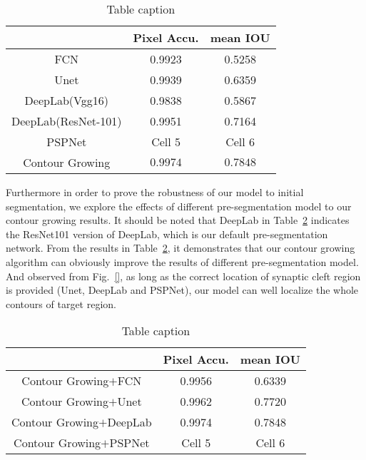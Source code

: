\begin{table}[t]
\begin{center}
\caption{Table caption} \label{tab:report1}
\begin{tabular}{|c|c|c|}
  \hline
   & Pixel Accu. & mean IOU
  \\
  \hline
  FCN & 0.9923 & 0.5258 \\
  Unet &  0.9939 & 0.6359 \\
  DeepLab(Vgg16) & 0.9838 & 0.5867 \\
  DeepLab(ResNet-101) & 0.9951 & 0.7164 \\
  PSPNet & Cell 5 & Cell 6 \\
  Contour Growing & $\mathbf{0.9974}$ & $\mathbf{0.7848}$ \\
  \hline
\end{tabular}
\end{center}
\end{table}

Furthermore in order to prove the robustness of our model to initial segmentation, we explore the effects of different pre-segmentation model to our contour growing results.
It should be noted that DeepLab in Table~\ref{tab:report2} indicates the ResNet101 version of DeepLab, which is our default pre-segmentation network.
From the results in Table~\ref{tab:report2}, it demonstrates that our contour growing algorithm can obviously improve the results of different pre-segmentation model.
And observed from Fig.~\ref{}, as long as the correct location of synaptic cleft region is provided (Unet, DeepLab and PSPNet), our model can well localize the whole contours of target region.

\begin{table}[t]
\begin{center}
\caption{Table caption} \label{tab:report2}
\begin{tabular}{|c|c|c|}
  \hline
   & Pixel Accu. & mean IOU
  \\
  \hline
  Contour Growing$+$FCN & 0.9956 & 0.6339 \\
  Contour Growing$+$Unet & 0.9962 & 0.7720 \\
  Contour Growing$+$DeepLab & 0.9974 & 0.7848 \\
  Contour Growing$+$PSPNet & Cell 5 & Cell 6 \\
  \hline
\end{tabular}
\end{center}
\end{table}
